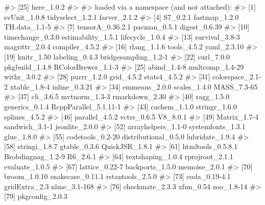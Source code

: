 \documentclass[
  letterpaper,
  DIV=11,
  numbers=noendperiod,
  oneside]{scrreprt}
\newenvironment{Shaded}{\begin{snugshade}}{\end{snugshade}}
\newcommand{\CommentTok}[1]{\textcolor[rgb]{0.37,0.37,0.37}{#1}}
\theoremstyle{definition}
\theoremstyle{plain}
\theoremstyle{definition}
\theoremstyle{remark}
\begin{document}
\begin{tcolorbox}
\begin{Shaded}
\begin{Highlighting}[]
\CommentTok{\#\textgreater{} [25] here\_1.0.2           }
\CommentTok{\#\textgreater{} }
\CommentTok{\#\textgreater{} loaded via a namespace (and not attached):}
\CommentTok{\#\textgreater{}  [1] svUnit\_1.0.8          tidyselect\_1.2.1      farver\_2.1.2         }
\CommentTok{\#\textgreater{}  [4] S7\_0.2.1              fastmap\_1.2.0         TH.data\_1.1{-}5        }
\CommentTok{\#\textgreater{}  [7] tensorA\_0.36.2.1      pacman\_0.5.1          digest\_0.6.39        }
\CommentTok{\#\textgreater{} [10] timechange\_0.3.0      estimability\_1.5.1    lifecycle\_1.0.4      }
\CommentTok{\#\textgreater{} [13] survival\_3.8{-}3        magrittr\_2.0.4        compiler\_4.5.2       }
\CommentTok{\#\textgreater{} [16] rlang\_1.1.6           tools\_4.5.2           yaml\_2.3.10          }
\CommentTok{\#\textgreater{} [19] knitr\_1.50            labeling\_0.4.3        bridgesampling\_1.2{-}1 }
\CommentTok{\#\textgreater{} [22] curl\_7.0.0            pkgbuild\_1.4.8        RColorBrewer\_1.1{-}3   }
\CommentTok{\#\textgreater{} [25] abind\_1.4{-}8           multcomp\_1.4{-}29       withr\_3.0.2          }
\CommentTok{\#\textgreater{} [28] purrr\_1.2.0           grid\_4.5.2            stats4\_4.5.2         }
\CommentTok{\#\textgreater{} [31] colorspace\_2.1{-}2      xtable\_1.8{-}4          inline\_0.3.21        }
\CommentTok{\#\textgreater{} [34] emmeans\_2.0.0         scales\_1.4.0          MASS\_7.3{-}65          }
\CommentTok{\#\textgreater{} [37] cli\_3.6.5             mvtnorm\_1.3{-}3         rmarkdown\_2.30       }
\CommentTok{\#\textgreater{} [40] ragg\_1.5.0            generics\_0.1.4        RcppParallel\_5.1.11{-}1}
\CommentTok{\#\textgreater{} [43] cachem\_1.1.0          stringr\_1.6.0         splines\_4.5.2        }
\CommentTok{\#\textgreater{} [46] parallel\_4.5.2        vctrs\_0.6.5           V8\_8.0.1             }
\CommentTok{\#\textgreater{} [49] Matrix\_1.7{-}4          sandwich\_3.1{-}1        jsonlite\_2.0.0       }
\CommentTok{\#\textgreater{} [52] arrayhelpers\_1.1{-}0    systemfonts\_1.3.1     glue\_1.8.0           }
\CommentTok{\#\textgreater{} [55] codetools\_0.2{-}20      distributional\_0.5.0  lubridate\_1.9.4      }
\CommentTok{\#\textgreater{} [58] stringi\_1.8.7         gtable\_0.3.6          QuickJSR\_1.8.1       }
\CommentTok{\#\textgreater{} [61] htmltools\_0.5.8.1     Brobdingnag\_1.2{-}9     R6\_2.6.1             }
\CommentTok{\#\textgreater{} [64] textshaping\_1.0.4     rprojroot\_2.1.1       evaluate\_1.0.5       }
\CommentTok{\#\textgreater{} [67] lattice\_0.22{-}7        backports\_1.5.0       memoise\_2.0.1        }
\CommentTok{\#\textgreater{} [70] broom\_1.0.10          snakecase\_0.11.1      rstantools\_2.5.0     }
\CommentTok{\#\textgreater{} [73] coda\_0.19{-}4.1         gridExtra\_2.3         nlme\_3.1{-}168         }
\CommentTok{\#\textgreater{} [76] checkmate\_2.3.3       xfun\_0.54             zoo\_1.8{-}14           }
\CommentTok{\#\textgreater{} [79] pkgconfig\_2.0.3}
\end{Highlighting}
\end{Shaded}

\end{tcolorbox}
\end{document}
